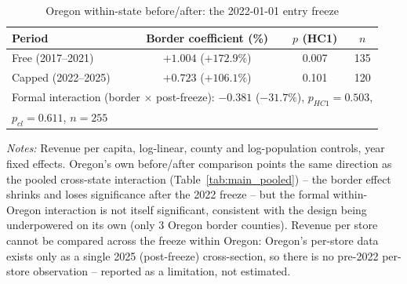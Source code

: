 \begin{table}[htbp]
\centering
\caption{Oregon within-state before/after: the 2022-01-01 entry freeze}
\label{tab:oregon_beforeafter}
\small
\begin{tabular}{lccc}
\toprule
Period & Border coefficient (\%) & $p$ (HC1) & $n$ \\
\midrule
Free (2017--2021) & $+1.004$ ($+172.9\%$) & 0.007 & 135 \\
Capped (2022--2025) & $+0.723$ ($+106.1\%$) & 0.101 & 120 \\
\midrule
\multicolumn{4}{l}{Formal interaction (border $\times$ post-freeze): $-0.381$ ($-31.7\%$), $p_{HC1}=0.503$,} \\
\multicolumn{4}{l}{$p_{cl}=0.611$, $n=255$} \\
\bottomrule
\end{tabular}
\begin{minipage}{0.85\textwidth}
\vspace{0.3em}
\footnotesize
\textit{Notes:} Revenue per capita, log-linear, county and log-population controls, year fixed effects.
Oregon's own before/after comparison points the same direction as the pooled cross-state interaction
(Table~\ref{tab:main_pooled}) -- the border effect shrinks and loses significance after the 2022 freeze --
but the formal within-Oregon interaction is not itself significant, consistent with the design being
underpowered on its own (only 3 Oregon border counties). Revenue per store cannot be compared across the
freeze within Oregon: Oregon's per-store data exists only as a single 2025 (post-freeze) cross-section, so
there is no pre-2022 per-store observation -- reported as a limitation, not estimated.
\end{minipage}
\end{table}
